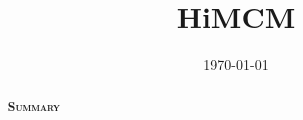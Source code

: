 \documentclass{class}
\title{HiMCM}
\date{\today}
\begin{document}
\begin{abstract}

\begin{center}
{\large\scshape\bfseries Summary}
\end{center}



\end{abstract}

\maketitle




\tableofcontents

\newpage


















\newpage



{\scriptsize

}

\pagebreak


\end{document}
